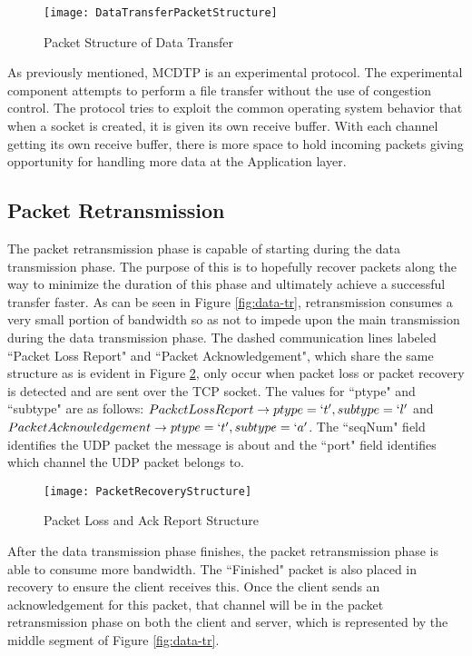 \begin{figure}[ht]
\centering
\texttt{[image: DataTransferPacketStructure]}
\caption{Packet Structure of Data Transfer}
\label{fig:data-tr-struct}
\end{figure}

As previously mentioned, MCDTP is an experimental protocol. The experimental component attempts to perform a file transfer without the use of congestion control. The protocol tries to exploit the common operating system behavior that when a socket is created, it is given its own receive buffer. With each channel getting its own receive buffer, there is more space to hold incoming packets giving opportunity for handling more data at the Application layer.

\subsection{Packet Retransmission}\label{subsec:pack-retr}

The packet retransmission phase is capable of starting during the data transmission phase. The purpose of this is to hopefully recover packets along the way to minimize the duration of this phase and ultimately achieve a successful transfer faster. As can be seen in Figure \ref{fig:data-tr}, retransmission consumes a very small portion of bandwidth so as not to impede upon the main transmission during the data transmission phase. The dashed communication lines labeled ``Packet Loss Report" and ``Packet Acknowledgement", which share the same structure as is evident in Figure \ref{fig:pack-rec-struct}, only occur when packet loss or packet recovery is detected and are sent over the TCP socket. The values for ``ptype" and ``subtype" are as follows: $Packet Loss Report \rightarrow ptype = \lq{t}\rq,subtype = \lq{l}\rq$ and $Packet Acknowledgement \rightarrow ptype = \lq{t}\rq,subtype = \lq{a}\rq$. The ``seqNum" field identifies the UDP packet the message is about and the ``port" field identifies which channel the UDP packet belongs to.

\begin{figure}[ht]
\centering
\texttt{[image: PacketRecoveryStructure]}
\caption{Packet Loss and Ack Report Structure}
\label{fig:pack-rec-struct}
\end{figure}

After the data transmission phase finishes, the packet retransmission phase is able to consume more bandwidth. The ``Finished" packet is also placed in recovery to ensure the client receives this. Once the client sends an acknowledgement for this packet, that channel will be in the packet retransmission phase on both the client and server, which is represented by the middle segment of Figure \ref{fig:data-tr}.

